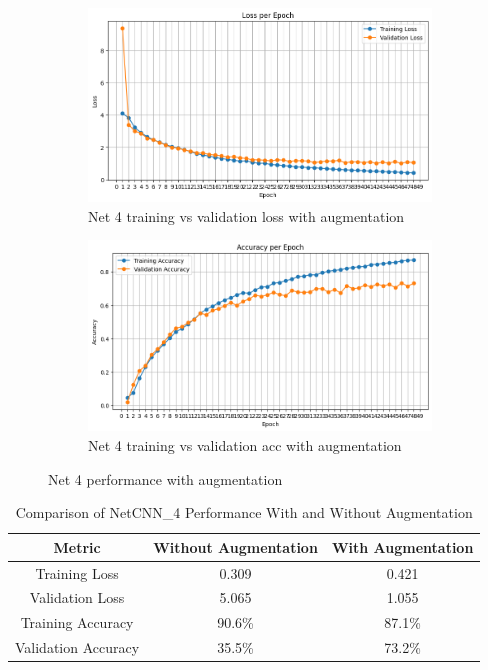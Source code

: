 \documentclass[12pt]{article}
\begin{document}
\begin{figure}[ht]
    \centering
    \begin{subfigure}{0.45\linewidth}
        \centering
        \includegraphics[width=\linewidth]{net4_aug_loss.png}
        \caption{Net 4 training vs validation loss with augmentation}
        \label{fig:net4_aug_loss}
    \end{subfigure}
    \hfill
    \begin{subfigure}{0.45\linewidth}
        \centering
        \includegraphics[width=\linewidth]{net4_aug_acc.png}
        \caption{Net 4 training vs validation acc with augmentation}
        \label{fig:net4_aug_acc}
    \end{subfigure}
    \caption{Net 4 performance with augmentation}
    \label{fig:net4_performance_with_augmentation}
\end{figure}


\begin{table}[ht]
    \centering
    \begin{tabular}{|c|c|c|}
        \hline
        \textbf{Metric} & \textbf{Without Augmentation} & \textbf{With Augmentation} \\
        \hline
        Training Loss & 0.309 & 0.421 \\
        \hline
        Validation Loss & 5.065 & 1.055 \\
        \hline
        Training Accuracy & 90.6\% & 87.1\% \\
        \hline
        Validation Accuracy & 35.5\% & 73.2\% \\
        \hline
    \end{tabular}
    \caption{Comparison of NetCNN\_4 Performance With and Without Augmentation}
    \label{tab:augmentation_comparison}
\end{table}
\end{document}
